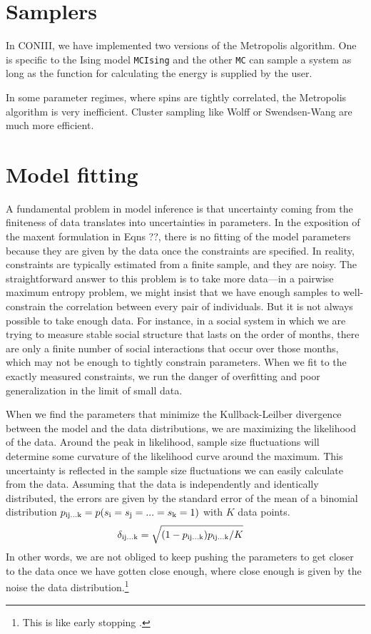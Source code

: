 \documentclass[aps,prl,twocolumn,nofootinbib]{revtex4-1}
\begin{document}
\section{Samplers}
In CONIII, we have implemented two versions of the Metropolis algorithm. One is specific to the Ising model {\tt MCIsing} and the other {\tt MC} can sample a system as long as the function for calculating the energy is supplied by the user.

In some parameter regimes, where spins are tightly correlated, the Metropolis algorithm is very inefficient. Cluster sampling like Wolff or Swendsen-Wang are much more efficient.


\section{Model fitting}
A fundamental problem in model inference is that uncertainty coming
from the finiteness of data translates into uncertainties in parameters.
In the exposition of the maxent formulation in Eqns ??, there is no fitting of the model parameters because they are given by the data once the constraints are specified. In reality, constraints are typically estimated from a finite sample, and they are noisy.
The straightforward answer to this problem is to take more data---in a pairwise
maximum entropy problem, we might insist that we have enough samples to well-constrain
the correlation between every pair of individuals.  But it is not always possible
to take enough data.  For instance, in a social system in which we are trying to
measure stable social structure that lasts on the order of months, there are only
a finite number of social interactions that occur over those months, which may
not be enough to tightly constrain parameters. When we fit to the exactly measured constraints, we run the danger of overfitting and poor generalization in the limit of small data.

When we find the parameters that minimize the Kullback-Leilber divergence between the model and the data distributions, we are maximizing the likelihood of the data. 
Around the peak in likelihood, sample size fluctuations will determine some curvature of the likelihood curve around the maximum.
This uncertainty is reflected in the sample size fluctuations we can easily calculate from the data. Assuming that the data is independently and identically distributed, the errors are given by the standard error of the mean of a binomial distribution \mbox{$p_{\rm ij...k} = p(s_{\rm i}=s_{\rm j}=...=s_{\rm k}=1)$} with $K$ data points.
\begin{align}
	\delta_{\rm ij...k} &= \sqrt{(1-p_{\rm ij...k})p_{\rm ij...k}/K}
\end{align}
In other words, we are not obliged to keep pushing the parameters to get closer to the data once we have gotten close enough, where close enough is given by the noise the data distribution.\footnote{This is like early stopping \cite{}.}
\end{document}
